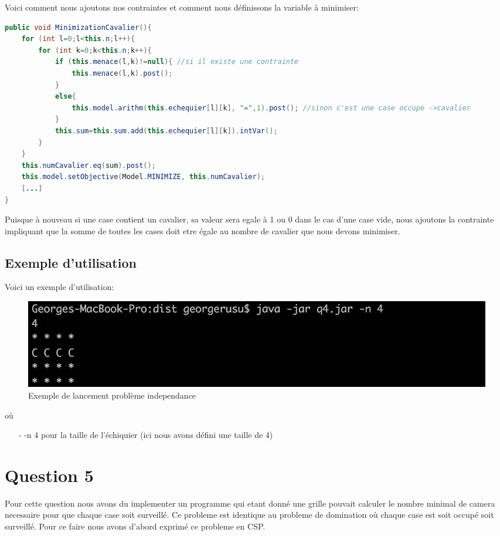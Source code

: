 \documentclass[a4paper,10pt]{article}
\begin{document}
Voici comment nous ajoutons nos contraintes et comment nous définissons la variable à minimiser:
\begin{lstlisting}[language=Java,basicstyle=\tiny]
public void MinimizationCavalier(){
	for (int l=0;l<this.n;l++){
		for (int k=0;k<this.n;k++){
			if (this.menace(l,k)!=null){ //si il existe une contrainte
				this.menace(l,k).post();
			}
			else{
				this.model.arithm(this.echequier[l][k], "=",1).post(); //sinon c'est une case occupe ->cavalier
			}
			this.sum=this.sum.add(this.echequier[l][k]).intVar();
		}	
	}
	this.numCavalier.eq(sum).post();
	this.model.setObjective(Model.MINIMIZE, this.numCavalier);
	[...]
}
\end{lstlisting}

Puisque à nouveau si une case contient un cavalier, sa valeur sera egale à 1 ou 0 dans le cas d'une case vide, nous ajoutons la contrainte impliquant que la somme de toutes les cases doit etre égale au nombre de cavalier que nous devons minimiser.

\subsection{Exemple d'utilisation}
Voici un exemple d'utilisation:
\begin{figure}[!h]
  \includegraphics[width=\linewidth]{img/q4.png}
  \caption{Exemple de lancement problème independance}
\end{figure}
\par où
\begin{enumerate}
	\item[-] -n 4 pour la taille de l'échiquier (ici nous avons défini une taille de 4)
\end{enumerate}
\section{Question 5}
\par Pour cette question nous avons du implementer un programme qui etant donné une grille pouvait calculer le nombre minimal de camera necessaire pour que chaque case soit surveillé. Ce probleme est identique au probleme de domination où chaque case est soit occupé soit surveillé. Pour ce faire nous avons d'abord exprimé ce probleme en CSP.
\end{document}
